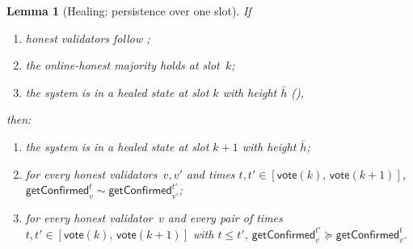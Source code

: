 \documentclass{article}
\newcommand{\vote}{\mathsf{vote}}
\newcommand{\comm}[1]{\bar{#1}}
\newcommand{\getConfirmed}{\textsf{getConfirmed}\xspace}
\theoremstyle{plain}
\newtheorem{lemma}{Lemma}
\theoremstyle{definition}
\theoremstyle{remark}
\newcommand{\OHM}{online-honest majority\xspace}
\begin{document}
\begin{lemma}[Healing: persistence over one slot]\label{rev:lem:healing-persistence}
If
\begin{enumerate}
  \item\label{rev:hp:f} honest validators follow ;
  \item\label{rev:hp:ohm} the \OHM holds at slot~$k$;
  \item\label{rev:hp:hs} the system is in a healed state at slot $k$ with height $\comm{h}$ (),
\end{enumerate}
then:
\begin{enumerate}
  \item the system is in a healed state at slot $k+1$ with height $\comm{h}$;
  \item for every honest validators~$v,v'$ and times $t, t' \in [\vote(k),\, \vote(k+1)]$, $\getConfirmed_v^{t} \sim \getConfirmed_{v'}^{t'}$;
  \item for every honest validator~$v$ and every pair of times $t, t' \in [\vote(k),\, \vote(k+1)]$ with $t \leq t'$, $\getConfirmed_v^{t'} \succeq \getConfirmed_v^t$.
\end{enumerate}
\end{lemma}
\end{document}
